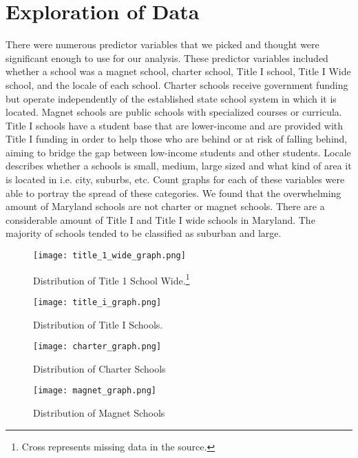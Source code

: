 \documentclass[12pt]{article}
\begin{document}
\section{Exploration of Data}
There were numerous predictor variables that we picked and thought were significant 
enough to use for our analysis. These predictor variables included whether a 
school was a magnet school, charter school, Title I school, Title I Wide school, 
and the locale of each school. Charter schools receive government funding but 
operate independently of the established state school system in which it is located. 
Magnet schools are public schools with specialized courses or curricula. Title I
schools have a student base that are lower-income and are provided with Title I 
funding in order to help those who are behind or at risk of falling behind, aiming 
to bridge the gap between low-income students and other students. Locale describes 
whether a schools is small, medium, large sized and what kind of area it is located 
in i.e. city, suburbs, etc. Count graphs for each of these variables were able to 
portray the spread of these categories. We found that the overwhelming amount of 
Maryland schools are not charter or magnet schools. There are a considerable amount 
of Title I and Title I wide schools in Maryland. The majority of schools tended to 
be classified as suburban and large.

\begin{figure}[!htb]
  \centering
  \texttt{[image: title\_1\_wide\_graph.png]}
  \caption{Distribution of Title 1 School Wide.\footnote{Cross represents missing data in the source.}}
  \label{fig:title_1_wide}
\end{figure}

\begin{figure}[!htb]
  \centering
  \texttt{[image: title\_i\_graph.png]}
  \caption{Distribution of Title I Schools.}
  \label{fig:title_i}
\end{figure}

\begin{figure}[!htb]
  \centering
  \texttt{[image: charter\_graph.png]}
  \caption{Distribution of Charter Schools}
  \label{fig:charter}
\end{figure}

\begin{figure}[!htb]
  \centering
  \texttt{[image: magnet\_graph.png]}
  \caption{Distribution of Magnet Schools}
  \label{fig:magnet}
\end{figure}
\end{document}
